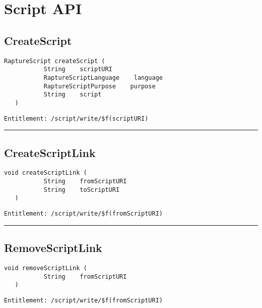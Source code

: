 \chapter{Script API}

\section{CreateScript}
\label{Api:CreateScript}
\begin{lstlisting}[style=nonumbers]
   RaptureScript createScript (
           String    scriptURI
           RaptureScriptLanguage    language
           RaptureScriptPurpose    purpose
           String    script
   )
\end{lstlisting}
\begin{Verbatim}[formatcom=\color{Maroon}]
  Entitlement: /script/write/$f(scriptURI)
\end{Verbatim}



\rule{12cm}{2pt}
\section{CreateScriptLink}
\label{Api:CreateScriptLink}
\begin{lstlisting}[style=nonumbers]
   void createScriptLink (
           String    fromScriptURI
           String    toScriptURI
   )
\end{lstlisting}
\begin{Verbatim}[formatcom=\color{Maroon}]
  Entitlement: /script/write/$f(fromScriptURI)
\end{Verbatim}



\rule{12cm}{2pt}
\section{RemoveScriptLink}
\label{Api:RemoveScriptLink}
\begin{lstlisting}[style=nonumbers]
   void removeScriptLink (
           String    fromScriptURI
   )
\end{lstlisting}
\begin{Verbatim}[formatcom=\color{Maroon}]
  Entitlement: /script/write/$f(fromScriptURI)
\end{Verbatim}



